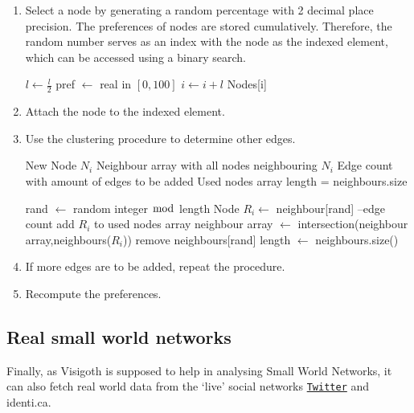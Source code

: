 \documentclass[a4paper,11pt,titlepage]{article}
\let\stdhref\href
\renewcommand{\href}[2]{\stdhref{#1}{\texttt{#2}}}
\newcommand{\Twitter}{\href{http://twitter.com}{Twitter} }
\begin{document}
\begin{enumerate}
  \item
    Select a node by generating a random percentage with 2 decimal place
    precision. The preferences of nodes are stored cumulatively. Therefore, the
    random number serves as an index with the node as the indexed element, which
    can be accessed using a binary search.

    \begin{algorithmic}
          \STATE $l \gets \frac{l}{2}$
            \STATE pref $\gets$ real in  $[0,100]$
              \STATE $i \gets i+l$
            \ENDIF
          \ENDIF
        \ENDWHILE
      \ENDFOR
      \RETURN Nodes[i]
    \end{algorithmic}

  \item
    Attach the node to the indexed element.

   \item
    Use the clustering procedure to determine other edges.

    \begin{algorithmic}
      \REQUIRE New Node $N_i$
      \REQUIRE Neighbour array with all nodes neighbouring $N_i$
      \REQUIRE Edge count with amount of edges to be added
      \REQUIRE Used nodes array
      \STATE length = neighbours.size

        \STATE rand $\gets$ random integer $\bmod$ length
        \STATE Node $R_i \gets$ neighbour[rand]
          \STATE --edge count
        \STATE add $R_i$ to used nodes array
          \STATE neighbour array $\gets$ intersection(neighbour array,neighbours($R_i$))
        \ELSE
          \STATE remove neighbours[rand]
        \ENDIF
        \STATE length $\gets$ neighbours.size()
      \ENDWHILE
    \end{algorithmic}

   \item
    If more edges are to be added, repeat the procedure.
  \item
    Recompute the preferences.
\end{enumerate}


\subsection{Real small world networks}
Finally, as Visigoth is supposed to help in analysing Small World
Networks, it can also fetch real world data from the `live' social
networks \Twitter and identi.ca.
\end{document}
